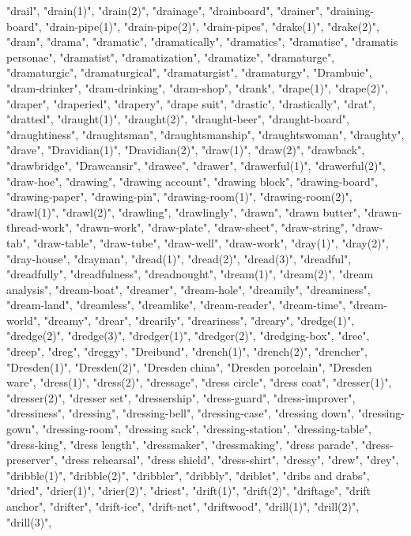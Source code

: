 "drail",
"drain(1)",
"drain(2)",
"drainage",
"drainboard",
"drainer",
"draining-board",
"drain-pipe(1)",
"drain-pipe(2)",
"drain-pipes",
"drake(1)",
"drake(2)",
"dram",
"drama",
"dramatic",
"dramatically",
"dramatics",
"dramatise",
"dramatis personae",
"dramatist",
"dramatization",
"dramatize",
"dramaturge",
"dramaturgic",
"dramaturgical",
"dramaturgist",
"dramaturgy",
"Drambuie",
"dram-drinker",
"dram-drinking",
"dram-shop",
"drank",
"drape(1)",
"drape(2)",
"draper",
"draperied",
"drapery",
"drape suit",
"drastic",
"drastically",
"drat",
"dratted",
"draught(1)",
"draught(2)",
"draught-beer",
"draught-board",
"draughtiness",
"draughtsman",
"draughtsmanship",
"draughtswoman",
"draughty",
"drave",
"Dravidian(1)",
"Dravidian(2)",
"draw(1)",
"draw(2)",
"drawback",
"drawbridge",
"Drawcansir",
"drawee",
"drawer",
"drawerful(1)",
"drawerful(2)",
"draw-hoe",
"drawing",
"drawing account",
"drawing block",
"drawing-board",
"drawing-paper",
"drawing-pin",
"drawing-room(1)",
"drawing-room(2)",
"drawl(1)",
"drawl(2)",
"drawling",
"drawlingly",
"drawn",
"drawn butter",
"drawn-thread-work",
"drawn-work",
"draw-plate",
"draw-sheet",
"draw-string",
"draw-tab",
"draw-table",
"draw-tube",
"draw-well",
"draw-work",
"dray(1)",
"dray(2)",
"dray-house",
"drayman",
"dread(1)",
"dread(2)",
"dread(3)",
"dreadful",
"dreadfully",
"dreadfulness",
"dreadnought",
"dream(1)",
"dream(2)",
"dream analysis",
"dream-boat",
"dreamer",
"dream-hole",
"dreamily",
"dreaminess",
"dream-land",
"dreamless",
"dreamlike",
"dream-reader",
"dream-time",
"dream-world",
"dreamy",
"drear",
"drearily",
"dreariness",
"dreary",
"dredge(1)",
"dredge(2)",
"dredge(3)",
"dredger(1)",
"dredger(2)",
"dredging-box",
"dree",
"dreep",
"dreg",
"dreggy",
"Dreibund",
"drench(1)",
"drench(2)",
"drencher",
"Dresden(1)",
"Dresden(2)",
"Dresden china",
"Dresden porcelain",
"Dresden ware",
"dress(1)",
"dress(2)",
"dressage",
"dress circle",
"dress coat",
"dresser(1)",
"dresser(2)",
"dresser set",
"dressership",
"dress-guard",
"dress-improver",
"dressiness",
"dressing",
"dressing-bell",
"dressing-case",
"dressing down",
"dressing-gown",
"dressing-room",
"dressing sack",
"dressing-station",
"dressing-table",
"dress-king",
"dress length",
"dressmaker",
"dressmaking",
"dress parade",
"dress-preserver",
"dress rehearsal",
"dress shield",
"dress-shirt",
"dressy",
"drew",
"drey",
"dribble(1)",
"dribble(2)",
"dribbler",
"dribbly",
"driblet",
"dribs and drabs",
"dried",
"drier(1)",
"drier(2)",
"driest",
"drift(1)",
"drift(2)",
"driftage",
"drift anchor",
"drifter",
"drift-ice",
"drift-net",
"driftwood",
"drill(1)",
"drill(2)",
"drill(3)",
